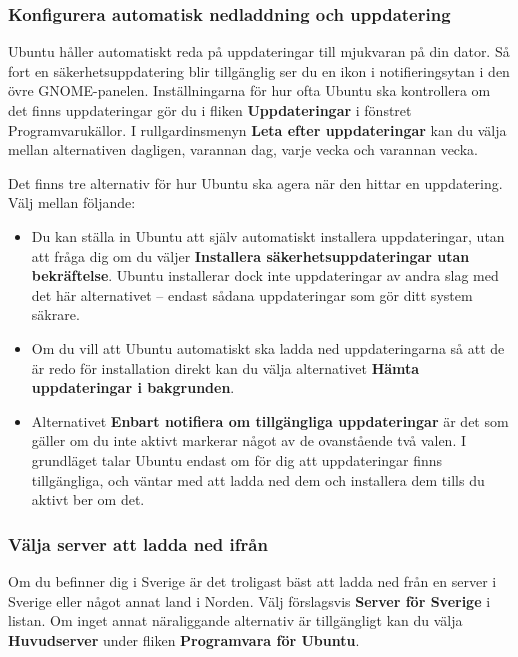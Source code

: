 \documentclass[a4paper,final]{memoir} %
\begin{document}
\subsubsection[Automatisk nedladdning och uppdatering]{Konfigurera automatisk nedladdning och uppdatering}\label{autouppdatering}


Ubuntu håller automatiskt reda på uppdateringar till mjukvaran på din dator. Så fort en säkerhetsuppdatering blir tillgänglig ser du en ikon i notifieringsytan i den övre GNOME-panelen. Inställningarna för hur ofta Ubuntu ska kontrollera om det finns uppdateringar gör du i fliken \textbf{Uppdateringar} i fönstret Programvarukällor. I rullgardinsmenyn \textbf{Leta efter uppdateringar} kan du välja mellan alternativen dagligen, varannan dag, varje vecka och varannan vecka. 

Det finns tre alternativ för hur Ubuntu ska agera när den hittar en uppdatering. Välj mellan följande:

\begin{itemize}

\item Du kan ställa in Ubuntu att själv automatiskt installera uppdateringar, utan att fråga dig om du väljer \textbf{Installera säkerhetsuppdateringar utan bekräftelse}. Ubuntu installerar dock inte uppdateringar av andra slag med det här alternativet -- endast sådana uppdateringar som gör ditt system säkrare. 

\item Om du vill att Ubuntu automatiskt ska ladda ned uppdateringarna så att de är redo för installation direkt kan du välja alternativet \textbf{Hämta uppdateringar i bakgrunden}. 

\item Alternativet \textbf{Enbart notifiera om tillgängliga uppdateringar} är det som gäller om du inte aktivt markerar något av de ovanstående två valen. I grundläget talar Ubuntu endast om för dig att uppdateringar finns tillgängliga, och väntar med att ladda ned dem och installera dem tills du aktivt ber om det.

\end{itemize}

\subsubsection{Välja server att ladda ned ifrån}

Om du befinner dig i Sverige är det troligast bäst att ladda ned från en server i Sverige eller något annat land i Norden. Välj förslagsvis \textbf{Server för Sverige} i listan. Om inget annat näraliggande alternativ är tillgängligt kan du välja \textbf{Huvudserver} under fliken \textbf{Programvara för Ubuntu}.
\end{document}
